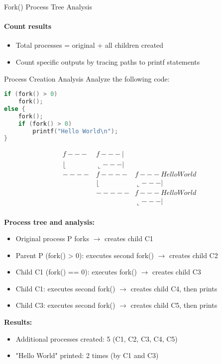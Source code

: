 \begin{KR}{Fork() Process Tree Analysis}
    \paragraph{Count results}
    \begin{itemize}
        \item Total processes = original + all children created
        \item Count specific outputs by tracing paths to printf statements
    \end{itemize}
\end{KR}

\begin{example2}{Process Creation Analysis}
    Analyze the following code:
    
\begin{lstlisting}[language=C, style=basesmol]
if (fork() > 0)
    fork();
else {
    fork();
    if (fork() > 0)
        printf("Hello World\n");
}
\end{lstlisting}

    \tcblower

    $$
    \begin{array}{lll}
        f--- & f---| & \\
        \lfloor     & \llcorner ---| & \\
        ---- & f---- & f--- Hello World \\
             & \lfloor      & \llcorner ---| \\
             & ----- & f--- Hello World \\
             &       & \llcorner ---|\\
    \end{array} 
    $$   
    
    \textbf{Process tree and analysis:}
    \begin{itemize}
        \item Original process P forks $\rightarrow$ creates child C1
        \item Parent P (fork() > 0): executes second fork() $\rightarrow$ creates child C2
        \item Child C1 (fork() == 0): executes fork() $\rightarrow$ creates child C3
        \item Child C1: executes second fork() $\rightarrow$ creates child C4, then prints
        \item Child C3: executes second fork() $\rightarrow$ creates child C5, then prints
    \end{itemize}
    
    \textbf{Results:}
    \begin{itemize}
        \item Additional processes created: 5 (C1, C2, C3, C4, C5)
        \item "Hello World" printed: 2 times (by C1 and C3)
    \end{itemize}
\end{example2}

